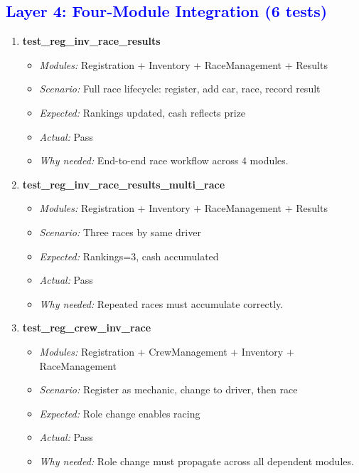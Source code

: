 \documentclass{article}
\begin{document}
\subsection*{\textcolor{blue}{Layer 4: Four-Module Integration (6 tests)}}

\begin{enumerate}[resume, label=\textbf{TC\arabic*.}]

\item \textbf{test\_reg\_inv\_race\_results}
\begin{itemize}[noitemsep]
  \item \textit{Modules:} Registration + Inventory + RaceManagement + Results
  \item \textit{Scenario:} Full race lifecycle: register, add car, race, record result
  \item \textit{Expected:} Rankings updated, cash reflects prize
  \item \textit{Actual:} Pass
  \item \textit{Why needed:} End-to-end race workflow across 4 modules.
\end{itemize}

\item \textbf{test\_reg\_inv\_race\_results\_multi\_race}
\begin{itemize}[noitemsep]
  \item \textit{Modules:} Registration + Inventory + RaceManagement + Results
  \item \textit{Scenario:} Three races by same driver
  \item \textit{Expected:} Rankings=3, cash accumulated
  \item \textit{Actual:} Pass
  \item \textit{Why needed:} Repeated races must accumulate correctly.
\end{itemize}

\item \textbf{test\_reg\_crew\_inv\_race}
\begin{itemize}[noitemsep]
  \item \textit{Modules:} Registration + CrewManagement + Inventory + RaceManagement
  \item \textit{Scenario:} Register as mechanic, change to driver, then race
  \item \textit{Expected:} Role change enables racing
  \item \textit{Actual:} Pass
  \item \textit{Why needed:} Role change must propagate across all dependent modules.
\end{itemize}


\end{enumerate}
\end{document}
